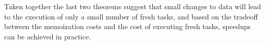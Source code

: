 \documentclass{article}
\begin{document}
Taken together the last two theorems suggest that small changes to
data will lead to the execution of only a small number of fresh tasks, and based
on the tradeoff between the memoization costs and the cost of
executing fresh tasks, speedups can be achieved in practice.








\end{document}
